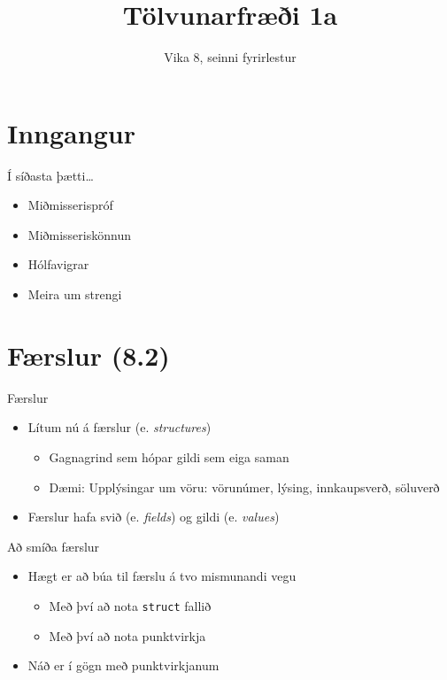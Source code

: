 \documentclass[handout]{beamer}
\title{Tölvunarfræði 1a}
\subtitle{Vika 8, seinni fyrirlestur}
\begin{document}
\begin{frame}
\titlepage
\end{frame}

\section{Inngangur}

\begin{frame}{Í síðasta þætti\ldots}
\begin{itemize}
 \item Miðmisserispróf
 \item Miðmisseriskönnun
 \item Hólfavigrar
 \item Meira um strengi
\end{itemize}
\end{frame}

\section{Færslur (8.2)}

\begin{frame}{Færslur}
\begin{itemize}
 \item Lítum nú á færslur (e. \emph{structures})
 \begin{itemize}
  \item Gagnagrind sem hópar gildi sem eiga saman
  \item Dæmi: Upplýsingar um vöru: vörunúmer, lýsing, innkaupsverð, söluverð
 \end{itemize}
 \item Færslur hafa svið (e. \emph{fields}) og gildi (e. \emph{values})
\end{itemize}
\end{frame}

\begin{frame}{Að smíða færslur}
\begin{itemize}
 \item Hægt er að búa til færslu á tvo mismunandi vegu
 \begin{itemize}
  \item Með því að nota \texttt{struct} fallið
  \item Með því að nota punktvirkja
 \end{itemize}
 \item Náð er í gögn með punktvirkjanum
\end{itemize}
\end{frame}
\end{document}

